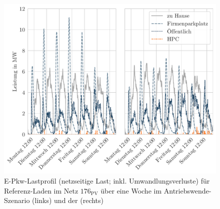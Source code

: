 \begin{figure}[H]
    \centering
    \includegraphics[width=\textwidth]{Bilder/example_load_profile}
    \caption[E-Pkw-Lastprofil für Referenz-Laden im Netz \num{176} über eine Woche im Antriebswende-Szenario und der Sensitivität Firmenparkplatz]{E-Pkw-Lastprofil (netzseitige Last; inkl. Umwandlungsverluste) für Referenz-Laden im Netz \(176_{\text{PV}}\) über eine Woche im Antriebswende-Szenario (links) und der \SzeFirmenparkplatz (rechts)}\label{fig:example_load_profile}
\end{figure}